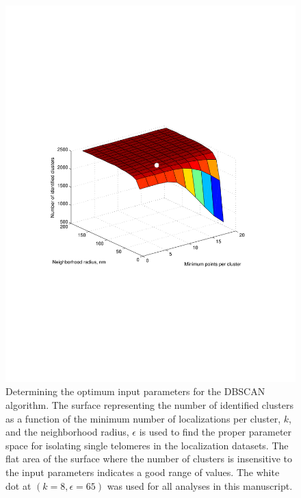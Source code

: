 \documentclass[12pt, a4paper]{article}
\begin{document}
\begin{figure}
  \centering
  \includegraphics[trim = 0 85mm 0 85mm, clip, scale = 0.6]{fig-dbscan-sweep.pdf}
  \caption{Determining the optimum input parameters for the DBSCAN algorithm. The surface representing the number of identified clusters as a function of the minimum number of localizations per cluster, $k$, and the neighborhood radius, $\epsilon$ is used to find the proper parameter space for isolating single telomeres in the localization datasets. The flat area of the surface where the number of clusters is insensitive to the input parameters indicates a good range of values. The white dot at $\left( k = 8, \epsilon = 65 \right)$ was used for all analyses in this manuscript.}
  \label{fig-dbscan-sweep}
\end{figure}
\end{document}
